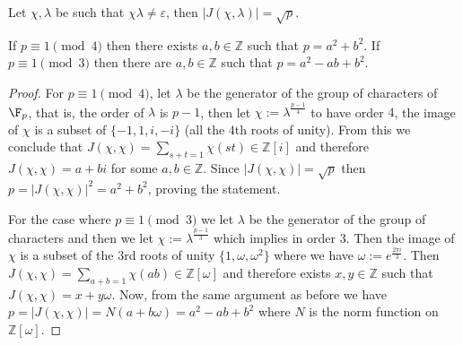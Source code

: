 \begin{proposition}
    Let \(\chi,\lambda\) be such that  \(\chi\lambda \neq  \varepsilon\), then
    \(|J(\chi,\lambda)| = \sqrt{p}\).
\end{proposition}

\begin{proposition}
    If \(p \equiv 1 \pmod{4}\) then there exists \(a, b \in \mathbb{Z}\) such
    that \(p = a^2 + b^2\). If  \(p \equiv 1 \pmod{3}\) then there are  \(a, b
    \in \mathbb{Z}\) such that \(p = a^2 - ab + b^2\).
\end{proposition}

\begin{proof}
    For \(p \equiv 1 \pmod{4}\), let \(\lambda \) be the generator of the group
    of characters of \(\F_p\), that is, the order of \(\lambda\) is \(p-1\), then
    let \(\chi := \lambda^{\frac{p-1}{4}}\) to have order \(4\), the image of
    \(\chi\) is a subset of \(\{-1, 1, i, -i\}\) (all the \(4\)th roots of
    unity). From this we conclude that \(J(\chi, \chi) = \sum_{s + t=1} \chi(st)
    \in \mathbb{Z}[i]\) and therefore \(J(\chi, \chi) = a + bi\) for some  \(a,
    b \in \mathbb{Z}\). Since \(|J(\chi,\chi)| = \sqrt{p}\) then \(p = |J(\chi,
    \chi)|^2 = a^2 + b^2\), proving the statement.

    For the case where \(p \equiv 1 \pmod{3}\) we let  \(\lambda\) be the
    generator of the group of characters and then we let \(\chi := \lambda^{
        \frac{p-1}{3}}\) which implies in order \(3\). Then the image of  \(\chi \)
    is a subset of the \(3\)rd roots of unity \(\{1, \omega, \omega^2\}\) where
    we have \(\omega:= e^{\frac{2\pi i }{3}}\). Then \(J(\chi, \chi) = \sum_{a+b
        = 1} \chi(ab) \in \mathbb{Z}[\omega]\) and therefore exists \(x, y \in
    \mathbb{Z}\) such that \(J(\chi, \chi) =x + y\omega\). Now, from the same
    argument as before we have  \(p = |J(\chi, \chi)| = N(a + b\omega) = a^2 - ab
    + b^2\) where \(N\) is the norm function on \(\mathbb{Z}[\omega]\).
\end{proof}
